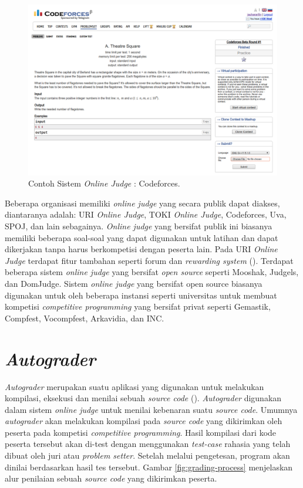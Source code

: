 \begin{figure}
	\centering
	\includegraphics[width=\textwidth]{images/codeforces}
	\caption{Contoh Sistem \textit{Online Judge} : Codeforces.}
	\label{fig:codeforces}
\end{figure}

\par Beberapa organisasi memiliki \textit{online judge} yang secara publik dapat diakses, diantaranya adalah: URI \textit{Online Judge}, TOKI \textit{Online Judge}, Codeforces, Uva, SPOJ, dan lain sebagainya. \textit{Online judge} yang bersifat publik ini biasanya memiliki beberapa soal-soal yang dapat digunakan untuk latihan dan dapat dikerjakan tanpa harus berkompetisi dengan peserta lain. Pada URI \textit{Online Judge} terdapat fitur tambahan seperti forum dan \textit{rewarding system} (\cite{uriojpaper}). Terdapat beberapa sistem \textit{online judge} yang bersifat \textit{open source} seperti Mooshak, Judgels, dan DomJudge. Sistem \textit{online judge} yang bersifat open source biasanya digunakan untuk oleh beberapa instansi seperti universitas untuk membuat kompetisi \textit{competitive programming} yang bersifat privat seperti Gemastik, Compfest, Vocompfest, Arkavidia, dan INC.

\section{\textit{Autograder}}

\par \textit{Autograder} merupakan suatu aplikasi yang digunakan untuk melakukan kompilasi, eksekusi dan menilai sebuah \textit{source code} (\cite{danutamalms}). \textit{Autograder} digunakan dalam sistem \textit{online judge} untuk menilai kebenaran suatu \textit{source code}. Umumnya \textit{autograder} akan melakukan kompilasi pada \textit{source code} yang dikirimkan oleh peserta pada kompetisi \textit{competitive programming}. Hasil kompilasi dari kode peserta tersebut akan di-test dengan menggunakan \textit{test-case} rahasia yang telah dibuat oleh juri atau \textit{problem setter}. Setelah melalui pengetesan, program akan dinilai berdasarkan hasil tes tersebut. Gambar \ref{fig:grading-process} menjelaskan alur penilaian sebuah \textit{source code} yang dikirimkan peserta.

